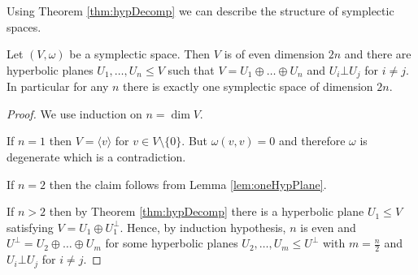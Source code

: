 Using Theorem \ref{thm:hypDecomp} we can describe the structure of symplectic spaces.

\begin{corollary}\label{cor:structureSympl}

Let $(V,\omega)$ be a symplectic space. Then $V$ is of even dimension $2n$ and there are hyperbolic planes $U_1,\dots, U_n\leq V$ such that $V=U_1\oplus\dots\oplus U_n$ and $U_i\bot U_j$ for $i\not=j$.
In particular for any $n$ there is exactly one symplectic space of dimension $2n$.
\end{corollary}
\begin{proof}
We use induction on $n=\dim V$.

If $n=1$ then $V=\langle v\rangle$ for $v\in V\setminus\{0\}$. But $\omega(v,v)=0$ and therefore $\omega$ is degenerate which is a contradiction.

If $n=2$ then the claim follows from Lemma \ref{lem:oneHypPlane}.

If $n>2$ then by Theorem \ref{thm:hypDecomp} there is a hyperbolic plane $U_1\leq V$ satisfying $V=U_1\oplus U_1^\bot$. Hence, by induction hypothesis, $n$ is even and $U^\bot =U_2\oplus\dots \oplus U_m$ for some hyperbolic planes $U_2,\dots,U_m\leq U^\bot$ with $m=\frac{n}{2}$ and $U_i\bot U_j$ for $i\not=j$.
\end{proof}

